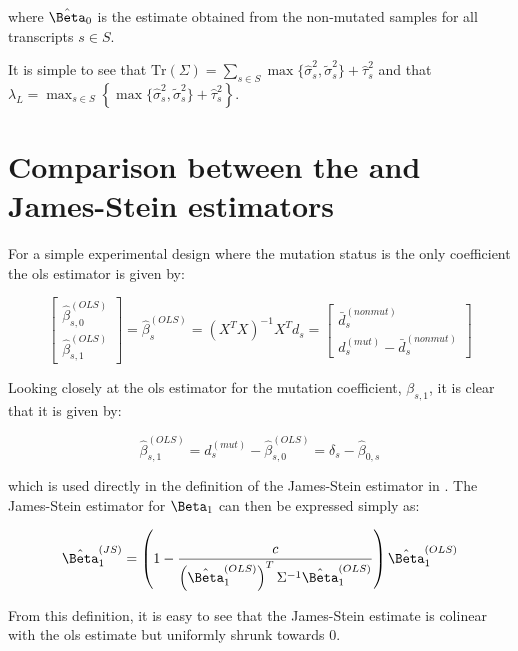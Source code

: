 where $\hat{\Beta}_0$ is the estimate obtained from the non-mutated samples for all transcripts $s \in S$.

It is simple to see that $\text{Tr}(\Sigma) = \sum_{s \in S} \max\{ \hat{\sigma}_s^2, \tilde{\sigma}_s^2 \} + \hat{\tau}_s^2$ and that $\lambda_L = \max_{s \in S} \left\{ \max\{ \hat{\sigma}_s^2, \tilde{\sigma}_s^2 \} + \hat{\tau}_s^2 \right\}$.

\section{Comparison between the  and James-Stein estimators}

For a simple experimental design where the mutation status is the only coefficient the \gls{ols} estimator is given by:

\begin{equation*}
  \begin{bmatrix}
    \hat{\beta}_{s,0}^{(OLS)} \\
    \hat{\beta}_{s,1}^{(OLS)}
  \end{bmatrix}
  = \hat{\beta}_s^{(OLS)}
  = (X^TX)^{-1}X^T d_s
  = \begin{bmatrix}
    \bar{d}_s^{(nonmut)} \\
    d_s^{(mut)} - \bar{d}_s^{(nonmut)}
  \end{bmatrix}
\end{equation*}

Looking closely at the \gls{ols} estimator for the mutation coefficient, $\beta_{s,1}$, it is clear that it is given by:

\begin{equation}
  \hat{\beta}_{s,1}^{(OLS)} = d_s^{(mut)} - \hat{\beta}_{s,0}^{(OLS)} = \delta_s - \hat{\beta}_{0,s}
\end{equation}

which is used directly in the definition of the James-Stein estimator in .
The James-Stein estimator for $\Beta_1$ can then be expressed simply as:

\begin{equation}
  \hat{\Beta}_1^{(JS)} = \left( 1 - \frac{c}{\left( \hat{\Beta}_1^{(OLS)} \right)^T \Sigma^{-1} \hat{\Beta}_1^{(OLS)}} \right) \hat{\Beta}_1^{(OLS)}
  \label{eqn:js_defn_ols}
\end{equation}

From this definition, it is easy to see that the James-Stein estimate is colinear with the \gls{ols} estimate but uniformly shrunk towards 0.

